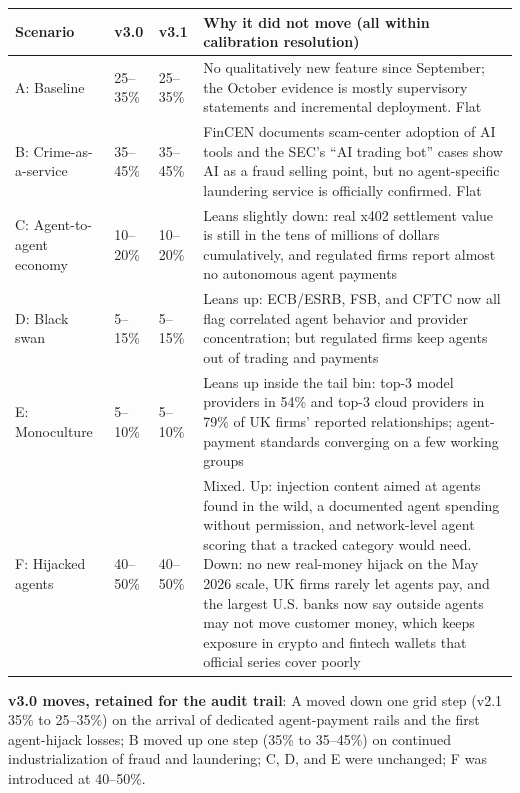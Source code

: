 \documentclass[11pt,letterpaper]{article}
\begin{document}
\begingroup\small
\begin{longtable}{L{0.235\dimexpr{}\tabcolsep\relax}L{0.085\dimexpr{}\tabcolsep\relax}L{0.13\dimexpr{}\tabcolsep\relax}L{0.55\dimexpr{}\tabcolsep\relax}}
\toprule
\textbf{Scenario} & \textbf{v3.0} & \textbf{v3.1} & \textbf{Why it did not move (all within calibration resolution)} \\
\midrule
\endhead
A: Baseline & 25--35\% & 25--35\% & No qualitatively new feature since September; the October evidence is mostly supervisory statements and incremental deployment. Flat \\
B: Crime-as-a-service & 35--45\% & 35--45\% & FinCEN documents scam-center adoption of AI tools and the SEC's ``AI trading bot'' cases show AI as a fraud selling point, but no agent-specific laundering service is officially confirmed. Flat \\
C: Agent-to-agent economy & 10--20\% & 10--20\% & Leans slightly down: real x402 settlement value is still in the tens of millions of dollars cumulatively, and regulated firms report almost no autonomous agent payments \\
D: Black swan & 5--15\% & 5--15\% & Leans up: ECB/ESRB, FSB, and CFTC now all flag correlated agent behavior and provider concentration; but regulated firms keep agents out of trading and payments \\
E: Monoculture & 5--10\% & 5--10\% & Leans up inside the tail bin: top-3 model providers in 54\% and top-3 cloud providers in 79\% of UK firms' reported relationships; agent-payment standards converging on a few working groups \\
F: Hijacked agents & 40--50\% & 40--50\% & Mixed. Up: injection content aimed at agents found in the wild, a documented agent spending without permission, and network-level agent scoring that a tracked category would need. Down: no new real-money hijack on the May 2026 scale, UK firms rarely let agents pay, and the largest U.S. banks now say outside agents may not move customer money, which keeps exposure in crypto and fintech wallets that official series cover poorly \\
\bottomrule
\end{longtable}
\endgroup

\textbf{v3.0 moves, retained for the audit trail}: A moved down one grid step (v2.1 35\% to 25--35\%) on the arrival of dedicated agent-payment rails and the first agent-hijack losses; B moved up one step (35\% to 35--45\%) on continued industrialization of fraud and laundering; C, D, and E were unchanged; F was introduced at 40--50\%.
\end{document}
